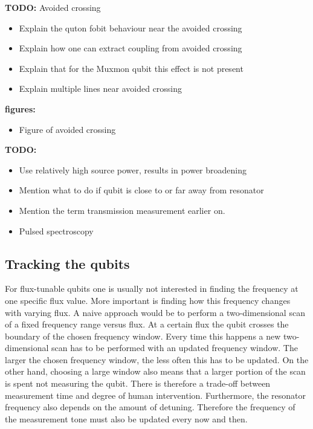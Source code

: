           \textbf{TODO:} Avoided crossing
          \begin{itemize}
            \item Explain the quton fobit behaviour near the avoided crossing
            \item Explain how one can extract coupling from avoided crossing
            \item Explain that for the Muxmon qubit this effect is not present
            \item Explain multiple lines near avoided crossing
          \end{itemize}

          \textbf{figures:}
          \begin{itemize}
            \item Figure of avoided crossing
          \end{itemize}


        \textbf{TODO:}
        \begin{itemize}
          \item Use relatively high source power, results in power broadening
          \item Mention what to do if qubit is close to or far away from resonator
          \item Mention the term transmission measurement earlier on.
          \item Pulsed spectroscopy
        \end{itemize}

      \subsection{Tracking the qubits}
        \label{ssec:tracked spectroscopy}
        For flux-tunable qubits one is usually not interested in finding the frequency at one specific flux value. More important is finding how this frequency changes with varying flux. A naive approach would be to perform a two-dimensional scan of a fixed frequency range versus flux. At a certain flux the qubit crosses the boundary of the chosen frequency window. Every time this happens a new two-dimensional scan has to be performed with an updated frequency window. The larger the chosen frequency window, the less often this has to be updated. On the other hand, choosing a large window also means that a larger portion of the scan is spent not measuring the qubit. There is therefore a trade-off between measurement time and degree of human intervention. Furthermore, the resonator frequency also depends on the amount of detuning. Therefore the frequency of the measurement tone must also be updated every now and then.

